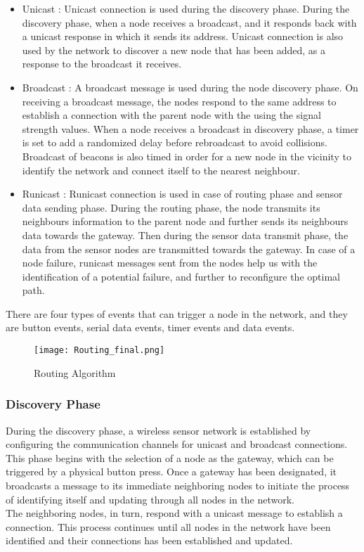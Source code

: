 \documentclass[conference]{IEEEtran}
\begin{document}
\begin{itemize}
    \item Unicast : Unicast connection is used during the discovery phase. During the discovery phase, when a node receives a broadcast, and it responds back with a unicast response in which it sends its address. Unicast connection is also used by the network to discover a new node that has been added, as a response to the broadcast it receives.
    \item Broadcast : A broadcast message is used during the node discovery phase. On receiving a broadcast message, the nodes respond to the same address to establish a connection with the parent node with the using the signal strength values. When a node receives a broadcast in discovery phase, a timer is set to add a randomized delay before rebroadcast to avoid collisions. Broadcast of beacons is also timed in order for a new node in the vicinity to identify the network and connect itself to the nearest neighbour.
    \item Runicast : Runicast connection is used in case of routing phase and sensor data sending phase. During the routing phase, the node transmits its neighbours information to the parent node and further sends its neighbours data towards the gateway. Then during the sensor data transmit phase, the data from the sensor nodes are transmitted towards the gateway. In case of a node failure, runicast messages sent from the nodes help us with the identification of a potential failure, and further to reconfigure the optimal path.
\end{itemize}

There are four types of events that can trigger a node in the network, and they are button events, serial data events, timer events and data events. 
\begin{figure}
  \texttt{[image: Routing\_final.png]}
  \caption{Routing Algorithm}
  \label{fig:Routing Algorithm}
\end{figure}
\subsubsection{Discovery Phase}\label{AA}
During the discovery phase, a wireless sensor network is established by configuring the communication channels for unicast and broadcast connections. This phase begins with the selection of a node as the gateway, which can be triggered by a physical button press. Once a gateway has been designated, it broadcasts a message to its immediate neighboring nodes to initiate the process of identifying itself and updating through all nodes in the network. \\
The neighboring nodes, in turn, respond with a unicast message to establish a connection. This process continues until all nodes in the network have been identified and their connections has been established and updated. 
\end{document}
